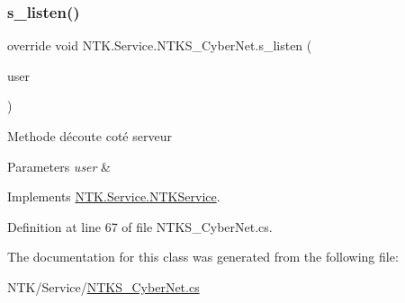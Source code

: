 \mbox{\label{class_n_t_k_1_1_service_1_1_n_t_k_s___cyber_net_a1584c291a5292d44e3076eaf3c3c1c67}} 
\subsubsection{\texorpdfstring{s\_listen()}{s\_listen()}}
{\footnotesize\ttfamily override void N\+T\+K.\+Service.\+N\+T\+K\+S\+\_\+\+Cyber\+Net.\+s\+\_\+listen (\begin{DoxyParamCaption}\item[{\mbox{\hyperlink{class_n_t_k_1_1_n_t_k_user}{N\+T\+K\+User}}}]{user }\end{DoxyParamCaption})\hspace{0.3cm}{\ttfamily [virtual]}}



Methode d\textquotesingle{}écoute coté serveur 


\begin{DoxyParams}{Parameters}
{\em user} & \\
\hline
\end{DoxyParams}


Implements \mbox{\hyperlink{class_n_t_k_1_1_service_1_1_n_t_k_service_a7c7cb8c5ddc57bebe6d9784744c976d7}{N\+T\+K.\+Service.\+N\+T\+K\+Service}}.



Definition at line 67 of file N\+T\+K\+S\+\_\+\+Cyber\+Net.\+cs.



The documentation for this class was generated from the following file\+:\begin{DoxyCompactItemize}
\item 
N\+T\+K/\+Service/\mbox{\hyperlink{_n_t_k_s___cyber_net_8cs}{N\+T\+K\+S\+\_\+\+Cyber\+Net.\+cs}}\end{DoxyCompactItemize}
